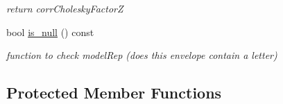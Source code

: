 \begin{DoxyCompactItemize}
\begin{DoxyCompactList}\small\item\em return corr\+Cholesky\+FactorZ \end{DoxyCompactList}\item 
bool \hyperlink{classPecos_1_1ProbabilityTransformation_a3c45461717ff230edd665ce24da988c5}{is\+\_\+null} () const \label{classPecos_1_1ProbabilityTransformation_a3c45461717ff230edd665ce24da988c5}

\begin{DoxyCompactList}\small\item\em function to check model\+Rep (does this envelope contain a letter) \end{DoxyCompactList}\end{DoxyCompactItemize}
\subsection*{Protected Member Functions}
